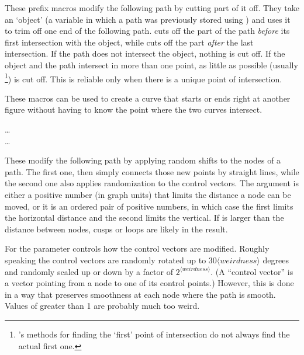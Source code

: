 \documentclass[letterpaper]{article}
\begin{document}
These prefix macros modify the following path by cutting part of it off.
They take an `object' (a variable in which a path was
previously stored using ) and uses it to trim off one end of the
following path.  cuts off the part of the path
\emph{before} its first intersection with the object, while
 cuts off the part \emph{after} the last intersection.
If the path does not intersect the object, nothing is cut off. If the
object and the path intersect in more than one point, as little as
possible (usually%
    \footnote{\MF{}'s methods for finding the `first' point of
    intersection do not always find the actual first one.}) %
is cut off. This is reliable only when there is a unique point of
intersection.

These macros can be used to create a curve that starts or ends
right at another figure without having to know the point where the two
curves intersect.

\begin{cd}
\dots\\
\dots
{}%
\end{cd}

These modify the following path by applying random shifts to the nodes
of a path. The first one,  then simply connects those
new points by straight lines, while the second one also applies
randomization to the control vectors. The  argument is
either a positive number (in graph units) that limits the distance a
node can be moved, or it is an ordered pair of positive numbers, in
which case the first limits the horizontal distance and the second
limits the vertical. If  is larger than the distance
between nodes, cusps or loops are likely in the result.

For  the  parameter controls how the
control vectors are modified. Roughly speaking the control vectors are
randomly rotated up to $30\langle\mathit{weirdness}\rangle$ degrees and
randomly scaled up or down by a factor of
$2^{\langle\mathit{weirdness}\rangle}$. (A ``control vector'' is a
vector pointing from a node to one of its control points.) However, this
is done in a way that preserves smoothness at each node where the path
is smooth. Values of  greater than 1 are probably much
too weird.
\end{document}
